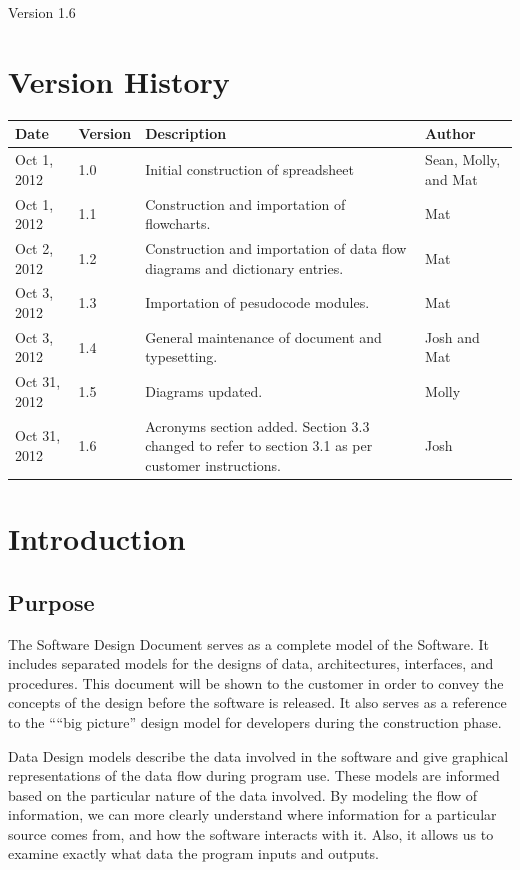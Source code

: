 \documentclass{article}
\title{\Title}
\author{\Author}
\date{\today}
\def\SDDVersion{1.6}
\def\Version{\SDDVersion}
\newcommand{\setupintro}{
\renewcommand{\thepage}{}
\maketitle
\begin{center}
\large Version \Version \normalsize
\end{center}
\newpage
\setcounter{page}{1}
\renewcommand{\thepage}{\roman{page}}
\tableofcontents 
\newpage
\setcounter{page}{1}
\renewcommand{\thepage}{\arabic{page}}
}
\begin{document}
\setupintro



\section{Version History}
\begin{tabular}{|l|l|p{3.25in}|l|}
\hline
Date & Version & Description & Author \\\hline
Oct 1, 2012 & 1.0 & Initial construction of spreadsheet & Sean, Molly, and Mat\\\hline
Oct 1, 2012 & 1.1 &Construction and importation of flowcharts.& Mat \\\hline
Oct 2, 2012 & 1.2 &Construction and importation of data flow diagrams and dictionary entries.& Mat \\\hline
Oct 3, 2012 & 1.3 &Importation of pesudocode modules.& Mat \\\hline
Oct 3, 2012 & 1.4 &General maintenance of document and typesetting.& Josh and Mat \\\hline
Oct 31, 2012 & 1.5 & Diagrams updated.& Molly \\\hline
Oct 31, 2012 & 1.6 & Acronyms section added.  Section 3.3 changed to refer to section 3.1 as per customer instructions.& Josh\\\hline
\end{tabular}

\section{Introduction}

\subsection{Purpose}
The Software Design Document serves as a complete model of the Software.  It includes separated models for the designs of data, architectures, interfaces, and procedures.  This document will be shown to the customer in order to convey the concepts of the design before the software is released.  It also serves as a reference to the “``big picture'' design model for developers during the construction phase.

Data Design models describe the data involved in the software and give graphical representations of the data flow during program use.  These models are informed based on the particular nature of the data involved.  By modeling the flow of information, we can more clearly understand where information for a particular source comes from, and how the software interacts with it.  Also, it allows us to examine exactly what data the program inputs and outputs.
\end{document}
